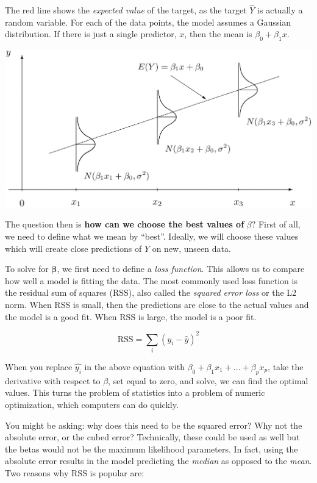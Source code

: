 \documentclass[openany]{book}
\begin{document}
The red line shows the \emph{expected value} of the target, as the target \(\hat{Y}\) is actually a random variable. For each of the data points, the model assumes a Gaussian distribution. If there is just a single predictor, \(x\), then the mean is \(\beta_0 + \beta_1 x\).

\begin{center}\includegraphics[width=2\linewidth]{images/conditional_response} \end{center}

The question then is \textbf{how can we choose the best values of} \(\beta?\) First of all, we need to define what we mean by ``best''. Ideally, we will choose these values which will create close predictions of \(Y\) on new, unseen data.

To solve for \(\mathbf{\beta}\), we first need to define a \emph{loss function}. This allows us to compare how well a model is fitting the data. The most commonly used loss function is the residual sum of squares (RSS), also called the \emph{squared error loss} or the L2 norm. When RSS is small, then the predictions are close to the actual values and the model is a good fit. When RSS is large, the model is a poor fit.

\[
\text{RSS} = \sum_i(y_i - \hat{y})^2
\]

When you replace \(\hat{y_i}\) in the above equation with \(\beta_0 + \beta_1 x_1 + ... + \beta_p x_p\), take the derivative with respect to \(\beta\), set equal to zero, and solve, we can find the optimal values. This turns the problem of statistics into a problem of numeric optimization, which computers can do quickly.

You might be asking: why does this need to be the squared error? Why not the absolute error, or the cubed error? Technically, these could be used as well but the betas would not be the maximum likelihood parameters. In fact, using the absolute error results in the model predicting the \emph{median} as opposed to the \emph{mean}. Two reasons why RSS is popular are:
\end{document}

